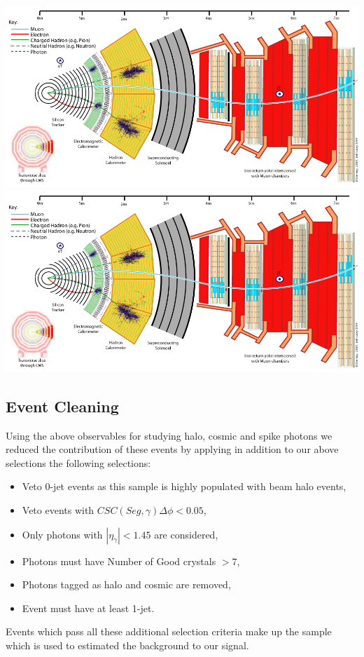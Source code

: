 \begin{center}
\centering
\includegraphics[scale=0.2]{THESISPLOTS/CMS_Slice.png}
\includegraphics[scale=0.2]{THESISPLOTS/CMS_Slice.png}
\label{fig:METS}
\end{center}

\subsection{Event Cleaning}
Using the above observables for studying halo, cosmic and spike photons we reduced the contribution of these events by applying in addition to our above selections the following selections:
\begin{itemize}
\item Veto 0-jet events as this sample is highly populated with beam halo events, 
\item Veto events with $CSC(Seg,\gamma)\Delta\phi < 0.05$,
\item Only photons with $|\eta_{\gamma}| < 1.45$ are considered,
\item Photons must have Number of Good crystals $ > 7$,
\item Photons tagged as halo and cosmic are removed,
\item Event must have at least 1-jet.
\end{itemize}
Events which pass all these additional selection criteria make up the sample which is used to estimated the background to our signal.

